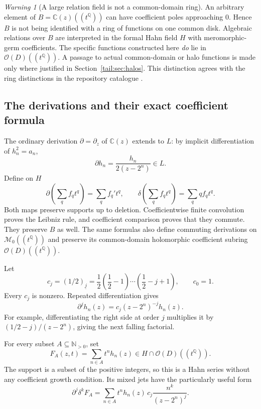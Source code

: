 \documentclass[11pt,a4paper]{article}
\numberwithin{equation}{section}
\theoremstyle{definition}
\theoremstyle{remark}
\newtheorem{warning}[theorem]{Warning}
\newcommand{\C}{\mathbb C}
\newcommand{\Q}{\mathbb Q}
\newcommand{\N}{\mathbb N}
\newcommand{\OO}{\mathcal O}
\newcommand{\EDer}{\delta}
\newcommand{\ff}[2]{(#1)_{\underline{#2}}}
\begin{document}
\begin{warning}[A large relation field is not a common-domain ring]
An arbitrary element of $B=\C(z)((t^\Q))$ can have coefficient poles
approaching $0$. Hence $B$ is not being identified with a ring of
functions on one common disk. Algebraic relations over $B$ are interpreted
in the formal Hahn field $H$ with meromorphic-germ coefficients. The
specific functions constructed here \emph{do} lie in
$\OO(D)((t^\Q))$. A passage to actual common-domain or halo functions is
made only where justified in Section~\ref{tail:sec:halos}. This distinction
agrees with the ring distinctions in the repository catalogue
\cite{RepoMap}.
\end{warning}

\subsection{The derivations and their exact coefficient formula}
The ordinary derivation $\partial=\partial_z$ of $\C(z)$ extends to $L$:
by implicit differentiation of $h_n^2=a_n$,
\[
 \partial h_n=\frac{h_n}{2(z-2^n)}\in L.
\]
Define on $H$
\begin{equation}\label{tail:eq:twoderivations}
 \partial\left(\sum_q f_qt^q\right)=\sum_q f_q't^q,
 \qquad
 \EDer\left(\sum_q f_qt^q\right)=\sum_q qf_qt^q.
\end{equation}
Both maps preserve supports up to deletion. Coefficientwise finite
convolution proves the Leibniz rule, and coefficient comparison proves
that they commute. They preserve $B$ as well. The same formulas also define commuting derivations on
$\mathscr M_0((t^\Q))$ and preserve its common-domain holomorphic
coefficient subring $\OO(D)((t^\Q))$.

Let
\[
 c_j=\ff{1/2}{j}=\frac12\left(\frac12-1\right)\cdots
                         \left(\frac12-j+1\right),\qquad c_0=1.
\]
Every $c_j$ is nonzero. Repeated differentiation gives
\begin{equation}\label{tail:eq:hnjet}
 \partial^jh_n(z)=c_j(z-2^n)^{-j}h_n(z).
\end{equation}
For example, differentiating the right side at order $j$ multiplies it
by $(1/2-j)/(z-2^n)$, giving the next falling factorial.

For every subset $A\subseteq\N_{>0}$, set
\begin{equation}\label{tail:eq:FA}
 F_A(z,t)=\sum_{n\in A}t^nh_n(z)\in H\cap\OO(D)((t^\Q)).
\end{equation}
The support is a subset of the positive integers, so this is a Hahn
series without any coefficient growth condition. Its mixed jets have the
particularly useful form
\begin{equation}\label{tail:eq:mixedcoefficients}
 \partial^j\EDer^kF_A
   =\sum_{n\in A}t^nh_n(z)\,
             c_j\frac{n^k}{(z-2^n)^j}.
\end{equation}
\end{document}
